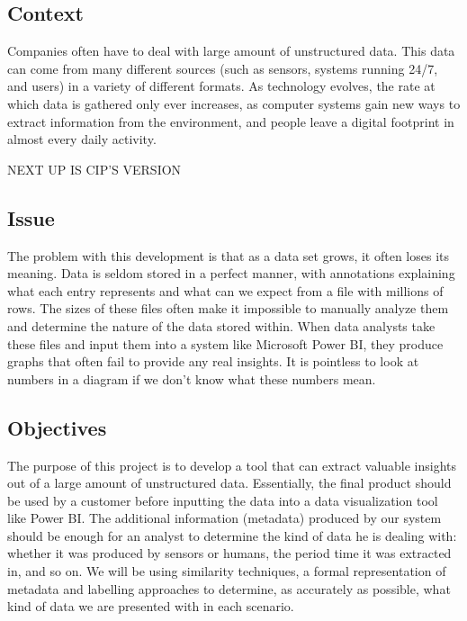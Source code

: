 \subsection{Context}
Companies often have to deal with large amount of unstructured data.
This data can come from many different sources (such as sensors, systems running 24/7, and users) in a variety of
different formats.
As technology evolves, the rate at which data is gathered only ever increases, as computer systems gain new ways to
extract information from the environment, and people leave a digital footprint in almost every daily activity.

\vspace{20mm}
NEXT UP IS CIP'S VERSION
\vspace{20mm}

\subsection{Issue}
The problem with this development is that as a data set grows, it often loses its meaning.
Data is seldom stored in a perfect manner, with annotations explaining what each entry represents and what can we
expect from a file with millions of rows.
The sizes of these files often make it impossible to manually analyze them and determine the nature of the data stored within.
When data analysts take these files and input them into a system like Microsoft Power BI, they produce graphs that often fail to
provide any real insights. 
It is pointless to look at numbers in a diagram if we don't know what these numbers mean.

\subsection{Objectives}
The purpose of this project is to develop a tool that can extract valuable insights out of a large amount of unstructured data.
Essentially, the final product should be used by a customer before inputting the data into a data visualization tool like Power BI.
The additional information (metadata) produced by our system should be enough for an analyst to determine the kind of data
he is dealing with: whether it was produced by sensors or humans, the period time it was extracted in, and so on.
We will be using similarity techniques, a formal representation of metadata and labelling approaches to determine, as
accurately as possible, what kind of data we are presented with in each scenario.

\bigbreak

